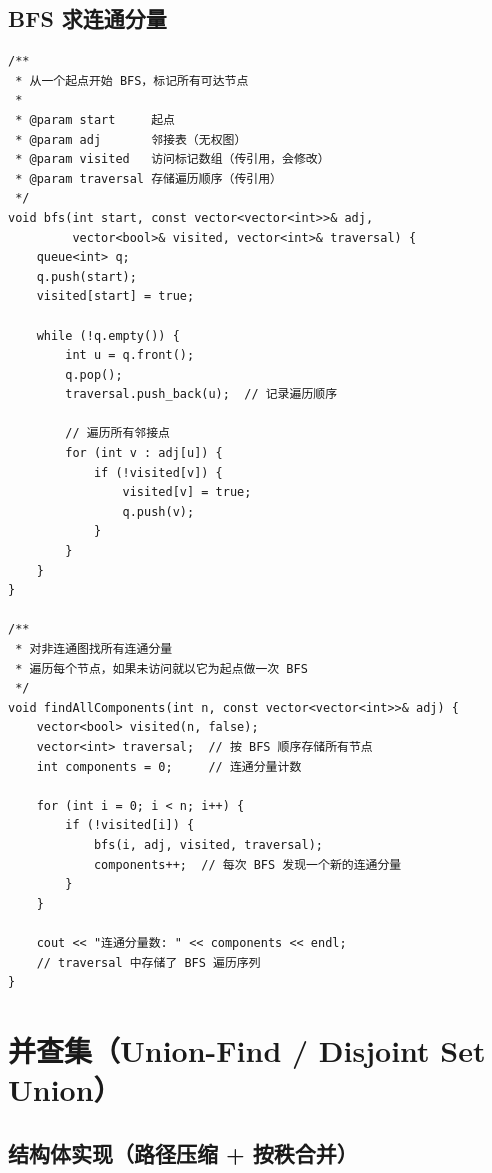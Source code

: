 \documentclass[12pt,a4paper]{article}
\begin{document}
\subsection{BFS 求连通分量}

\begin{lstlisting}
/**
 * 从一个起点开始 BFS，标记所有可达节点
 *
 * @param start     起点
 * @param adj       邻接表（无权图）
 * @param visited   访问标记数组（传引用，会修改）
 * @param traversal 存储遍历顺序（传引用）
 */
void bfs(int start, const vector<vector<int>>& adj,
         vector<bool>& visited, vector<int>& traversal) {
    queue<int> q;
    q.push(start);
    visited[start] = true;

    while (!q.empty()) {
        int u = q.front();
        q.pop();
        traversal.push_back(u);  // 记录遍历顺序

        // 遍历所有邻接点
        for (int v : adj[u]) {
            if (!visited[v]) {
                visited[v] = true;
                q.push(v);
            }
        }
    }
}

/**
 * 对非连通图找所有连通分量
 * 遍历每个节点，如果未访问就以它为起点做一次 BFS
 */
void findAllComponents(int n, const vector<vector<int>>& adj) {
    vector<bool> visited(n, false);
    vector<int> traversal;  // 按 BFS 顺序存储所有节点
    int components = 0;     // 连通分量计数

    for (int i = 0; i < n; i++) {
        if (!visited[i]) {
            bfs(i, adj, visited, traversal);
            components++;  // 每次 BFS 发现一个新的连通分量
        }
    }

    cout << "连通分量数: " << components << endl;
    // traversal 中存储了 BFS 遍历序列
}
\end{lstlisting}

\newpage

\section{并查集（Union-Find / Disjoint Set Union）}

\subsection{结构体实现（路径压缩 + 按秩合并）}
\end{document}
